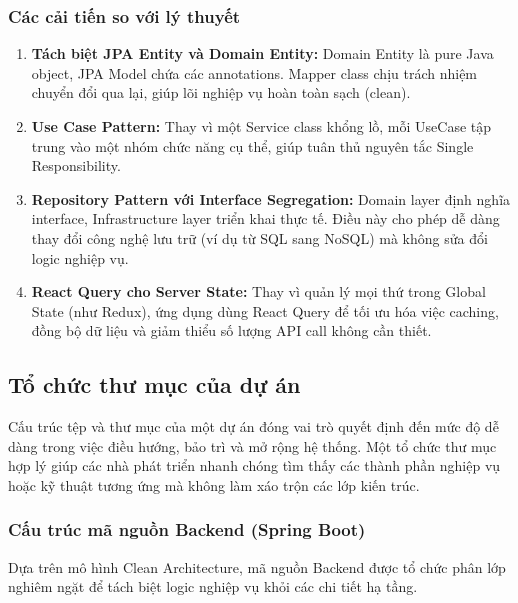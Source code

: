 \subsubsection{Các cải tiến so với lý thuyết}

\begin{enumerate}
    \item \textbf{Tách biệt JPA Entity và Domain Entity:} Domain Entity là pure Java object, JPA Model chứa các annotations. Mapper class chịu trách nhiệm chuyển đổi qua lại, giúp lõi nghiệp vụ hoàn toàn sạch (clean).
    \item \textbf{Use Case Pattern:} Thay vì một Service class khổng lồ, mỗi UseCase tập trung vào một nhóm chức năng cụ thể, giúp tuân thủ nguyên tắc Single Responsibility.
    \item \textbf{Repository Pattern với Interface Segregation:} Domain layer định nghĩa interface, Infrastructure layer triển khai thực tế. Điều này cho phép dễ dàng thay đổi công nghệ lưu trữ (ví dụ từ SQL sang NoSQL) mà không sửa đổi logic nghiệp vụ.
    \item \textbf{React Query cho Server State:} Thay vì quản lý mọi thứ trong Global State (như Redux), ứng dụng dùng React Query để tối ưu hóa việc caching, đồng bộ dữ liệu và giảm thiểu số lượng API call không cần thiết.
\end{enumerate}

\subsection{Tổ chức thư mục của dự án}
Cấu trúc tệp và thư mục của một dự án đóng vai trò quyết định đến mức độ dễ dàng trong việc điều hướng, bảo trì và mở rộng hệ thống. Một tổ chức thư mục hợp lý giúp các nhà phát triển nhanh chóng tìm thấy các thành phần nghiệp vụ hoặc kỹ thuật tương ứng mà không làm xáo trộn các lớp kiến trúc.

\subsubsection{Cấu trúc mã nguồn Backend (Spring Boot)}

Dựa trên mô hình Clean Architecture, mã nguồn Backend được tổ chức phân lớp nghiêm ngặt để tách biệt logic nghiệp vụ khỏi các chi tiết hạ tầng.

